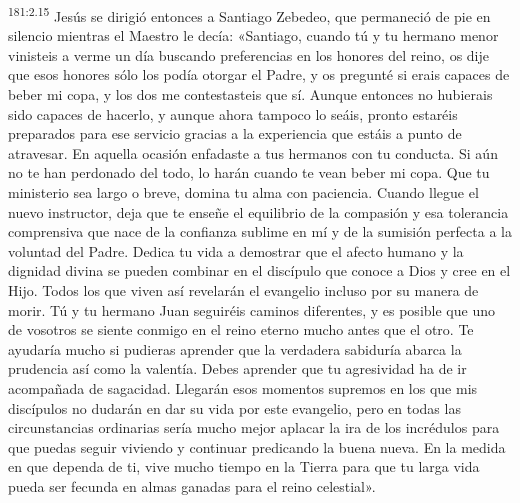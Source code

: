 \par 
\textsuperscript{181:2.15} Jesús se dirigió entonces a Santiago Zebedeo, que permaneció de pie en silencio mientras el Maestro le decía: «Santiago, cuando tú y tu hermano menor vinisteis a verme un día buscando preferencias en los honores del reino, os dije que esos honores sólo los podía otorgar el Padre, y os pregunté si erais capaces de beber mi copa, y los dos me contestasteis que sí. Aunque entonces no hubierais sido capaces de hacerlo, y aunque ahora tampoco lo seáis, pronto estaréis preparados para ese servicio gracias a la experiencia que estáis a punto de atravesar. En aquella ocasión enfadaste a tus hermanos con tu conducta. Si aún no te han perdonado del todo, lo harán cuando te vean beber mi copa. Que tu ministerio sea largo o breve, domina tu alma con paciencia. Cuando llegue el nuevo instructor, deja que te enseñe el equilibrio de la compasión y esa tolerancia comprensiva que nace de la confianza sublime en mí y de la sumisión perfecta a la voluntad del Padre. Dedica tu vida a demostrar que el afecto humano y la dignidad divina se pueden combinar en el discípulo que conoce a Dios y cree en el Hijo. Todos los que viven así revelarán el evangelio incluso por su manera de morir. Tú y tu hermano Juan seguiréis caminos diferentes, y es posible que uno de vosotros se siente conmigo en el reino eterno mucho antes que el otro. Te ayudaría mucho si pudieras aprender que la verdadera sabiduría abarca la prudencia así como la valentía. Debes aprender que tu agresividad ha de ir acompañada de sagacidad. Llegarán esos momentos supremos en los que mis discípulos no dudarán en dar su vida por este evangelio, pero en todas las circunstancias ordinarias sería mucho mejor aplacar la ira de los incrédulos para que puedas seguir viviendo y continuar predicando la buena nueva. En la medida en que dependa de ti, vive mucho tiempo en la Tierra para que tu larga vida pueda ser fecunda en almas ganadas para el reino celestial».

